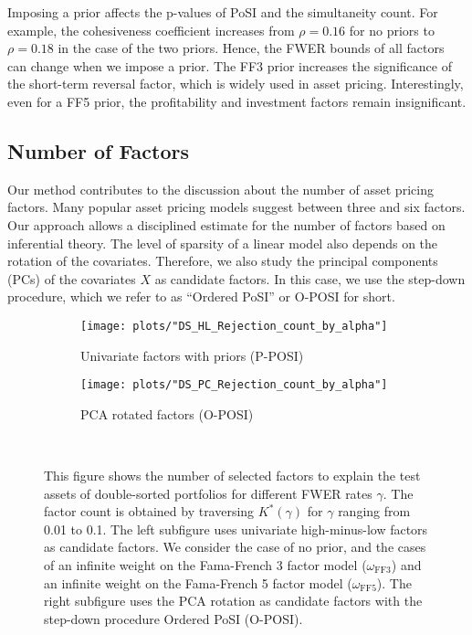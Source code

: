 \documentclass[11pt]{article}
\newcommand\tcaptab[1]{\captionsetup{position=top, font=normalsize, labelfont=bf, textfont=normalfont, justification=centering, margin=0mm, aboveskip=1mm, belowskip=0mm, labelsep=colon, singlelinecheck=false}\caption{#1}}
\newcommand\bnotefig[1]{\captionsetup{position=bottom, font=footnotesize,  textfont=normalfont, margin=1mm, skip=2mm, justification=justified, singlelinecheck=false}\caption*{#1}}
\begin{document}
Imposing a prior affects the p-values of PoSI and the simultaneity count. For example, the cohesiveness coefficient increases from $\rho=0.16$ for no priors to $\rho=0.18$ in the case of the two priors. Hence, the FWER bounds of all factors can change when we impose a prior. The FF3 prior increases the significance of the short-term reversal factor, which is widely used in asset pricing. Interestingly, even for a FF5 prior, the profitability and investment factors remain insignificant. 




\subsection{Number of Factors}

Our method contributes to the discussion about the number of asset pricing factors. Many popular asset pricing models suggest between three and six factors. Our approach allows a disciplined estimate for the number of factors based on inferential theory. The level of sparsity of a linear model also depends on the rotation of the covariates. Therefore, we also study the principal components (PCs) of the covariates $X$ as candidate factors. In this case, we use the step-down procedure, which we refer to as ``Ordered PoSI'' or O-POSI for short.

\begin{figure}[t!]
	\centering	\tcaptab{Number of selected factors for different FWER}	
	\label{fig:number}\centering
	\begin{subfigure}[t]{.48\textwidth}\centering
		\texttt{[image: plots/"DS\_HL\_Rejection\_count\_by\_alpha"]}
		\caption{Univariate factors with priors (P-POSI)}
	\end{subfigure}
	\begin{subfigure}[t]{.48\textwidth}\centering
		\texttt{[image: plots/"DS\_PC\_Rejection\_count\_by\_alpha"]}\\
		\caption{PCA rotated factors (O-POSI)}
	\end{subfigure}\\
	\bnotefig{This figure shows the number of selected factors to explain the test assets of double-sorted portfolios for different FWER rates $\gamma$. The factor count is obtained by traversing $K^*(\gamma)$ for $\gamma$ ranging from 0.01 to 0.1. The left subfigure uses univariate high-minus-low factors as candidate factors. We consider the case of no prior, and the cases of an infinite weight on the Fama-French 3 factor model ($\omega_{\text{FF3}}$) and an infinite weight on the Fama-French 5 factor model ($\omega_{\text{FF5}}$). The right subfigure uses the PCA rotation as candidate factors with the step-down procedure Ordered PoSI (O-POSI).}
\end{figure}
\end{document}
